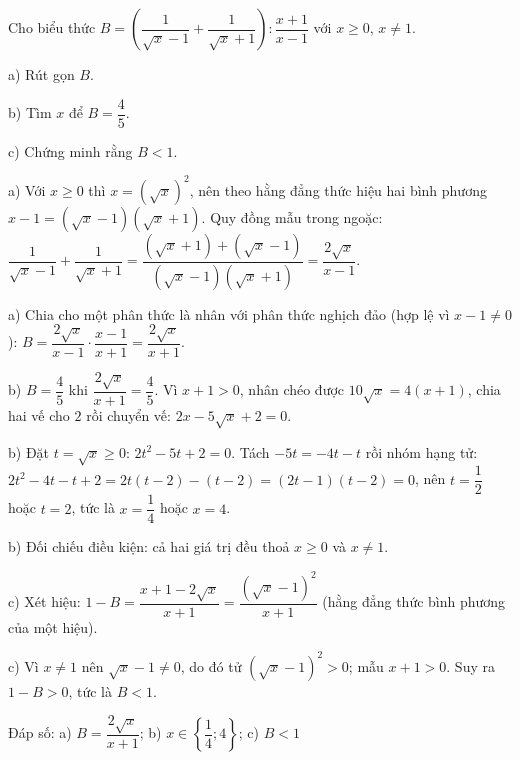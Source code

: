 \begin{problem}[9DS-CAN-045]
Cho biểu thức $B = \left(\dfrac{1}{\sqrt{x} - 1} + \dfrac{1}{\sqrt{x} + 1}\right) : \dfrac{x + 1}{x - 1}$ với $x \geq 0$, $x \neq 1$.

a) Rút gọn $B$.

b) Tìm $x$ để $B = \dfrac{4}{5}$.

c) Chứng minh rằng $B < 1$.

\begin{solution}
a) Với $x \geq 0$ thì $x = (\sqrt{x})^2$, nên theo hằng đẳng thức hiệu hai bình phương $x - 1 = (\sqrt{x} - 1)(\sqrt{x} + 1)$. Quy đồng mẫu trong ngoặc: $\dfrac{1}{\sqrt{x} - 1} + \dfrac{1}{\sqrt{x} + 1} = \dfrac{(\sqrt{x} + 1) + (\sqrt{x} - 1)}{(\sqrt{x} - 1)(\sqrt{x} + 1)} = \dfrac{2\sqrt{x}}{x - 1}$.

a) Chia cho một phân thức là nhân với phân thức nghịch đảo (hợp lệ vì $x - 1 \neq 0$): $B = \dfrac{2\sqrt{x}}{x - 1} \cdot \dfrac{x - 1}{x + 1} = \dfrac{2\sqrt{x}}{x + 1}$.

b) $B = \dfrac{4}{5}$ khi $\dfrac{2\sqrt{x}}{x + 1} = \dfrac{4}{5}$. Vì $x + 1 > 0$, nhân chéo được $10\sqrt{x} = 4(x + 1)$, chia hai vế cho $2$ rồi chuyển vế: $2x - 5\sqrt{x} + 2 = 0$.

b) Đặt $t = \sqrt{x} \geq 0$: $2t^2 - 5t + 2 = 0$. Tách $-5t = -4t - t$ rồi nhóm hạng tử: $2t^2 - 4t - t + 2 = 2t(t - 2) - (t - 2) = (2t - 1)(t - 2) = 0$, nên $t = \dfrac{1}{2}$ hoặc $t = 2$, tức là $x = \dfrac{1}{4}$ hoặc $x = 4$.

b) Đối chiếu điều kiện: cả hai giá trị đều thoả $x \geq 0$ và $x \neq 1$.

c) Xét hiệu: $1 - B = \dfrac{x + 1 - 2\sqrt{x}}{x + 1} = \dfrac{(\sqrt{x} - 1)^2}{x + 1}$ (hằng đẳng thức bình phương của một hiệu).

c) Vì $x \neq 1$ nên $\sqrt{x} - 1 \neq 0$, do đó tử $(\sqrt{x} - 1)^2 > 0$; mẫu $x + 1 > 0$. Suy ra $1 - B > 0$, tức là $B < 1$.

Đáp số: a) $\boxed{B = \dfrac{2\sqrt{x}}{x + 1}}$; b) $\boxed{x \in \left\{\dfrac{1}{4}; 4\right\}}$; c) $\boxed{B < 1}$
\end{solution}
\end{problem}

